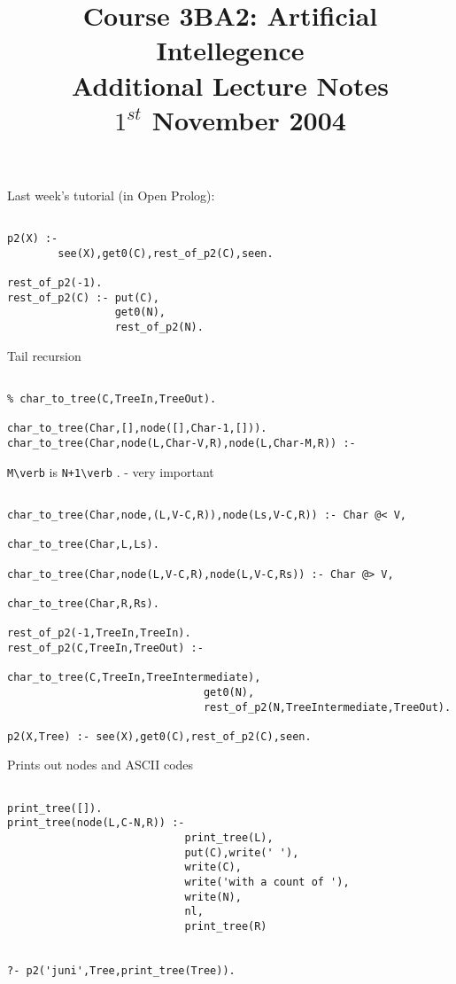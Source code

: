 \documentclass[a4paper,12pt]{article}
\begin{document}
\title{Course 3BA2: Artificial Intellegence \\ Additional Lecture Notes \\ $1^{st}$ November 2004}

\maketitle

Last week's tutorial (in Open Prolog):

\begin{verbatim}

p2(X) :-
        see(X),get0(C),rest_of_p2(C),seen.

rest_of_p2(-1).
rest_of_p2(C) :- put(C),
                 get0(N),
                 rest_of_p2(N).

\end{verbatim}

Tail recursion

\begin{verbatim}

% char_to_tree(C,TreeIn,TreeOut).

char_to_tree(Char,[],node([],Char-1,[])).
char_to_tree(Char,node(L,Char-V,R),node(L,Char-M,R)) :-

\end{verbatim}

\verb!M\verb! is \verb!N+1\verb! . - very important

\begin{verbatim}

char_to_tree(Char,node,(L,V-C,R)),node(Ls,V-C,R)) :- Char @< V,
                                                      char_to_tree(Char,L,Ls).

char_to_tree(Char,node(L,V-C,R),node(L,V-C,Rs)) :- Char @> V,
                                                   char_to_tree(Char,R,Rs).

rest_of_p2(-1,TreeIn,TreeIn).
rest_of_p2(C,TreeIn,TreeOut) :-
                               char_to_tree(C,TreeIn,TreeIntermediate),
                               get0(N),
                               rest_of_p2(N,TreeIntermediate,TreeOut).

p2(X,Tree) :- see(X),get0(C),rest_of_p2(C),seen.

\end{verbatim}

Prints out nodes and ASCII codes

\begin{verbatim}

print_tree([]).
print_tree(node(L,C-N,R)) :-
                            print_tree(L),
                            put(C),write(' '),
                            write(C),
                            write('with a count of '),
                            write(N),
                            nl,
                            print_tree(R)


?- p2('juni',Tree,print_tree(Tree)).

\end{verbatim}
\end{document}
